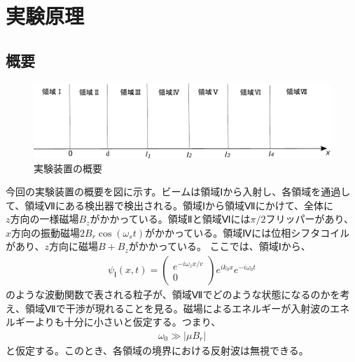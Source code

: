 \def\vector#1{\mbox{\boldmath $#1$}}
\section{実験原理}
\subsection{概要}
\begin{figure}[h]
\begin{center}
\includegraphics[width=13cm]{pi2flipper/zenntaizu.pdf}
\caption{実験装置の概要}
\end{center}
\end{figure}
今回の実験装置の概要を図に示す。ビームは領域Ⅰから入射し、各領域を通過して、領域Ⅶにある検出器で検出される。領域Ⅰから領域Ⅶにかけて、全体に$z方向の一様磁場B_{z}$がかかっている。領域Ⅱと領域Ⅵには$\pi/2フリッパー$があり、$x方向の振動磁場2B_{r}\cos(\omega_{s}t)$がかかっている。領域Ⅳには位相シフタコイルがあり、$z方向に磁場B+B_{z}$がかかっている。
ここでは、領域Ⅰから、
\begin{align}
{\psi}_{Ⅰ}(x,t)=
\begin{pmatrix}
e^{-i\omega_{z}x/v} \\
0
\end{pmatrix}
e^{ik_{0}x}e^{-i\omega_{0}t}
\end{align}
のような波動関数で表される粒子が、領域Ⅶでどのような状態になるのかを考え、領域Ⅶで干渉が現れることを見る。磁場によるエネルギーが入射波のエネルギーよりも十分に小さいと仮定する。つまり、
\begin{align}
\omega_{0} \gg |{\mu}B_{r}|
\end{align}
と仮定する。このとき、各領域の境界における反射波は無視できる。
